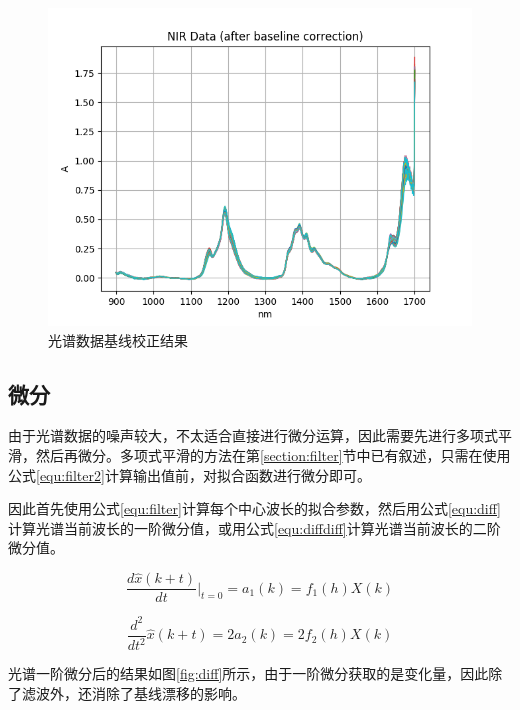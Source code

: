 \documentclass[a4paper, 12pt]{article}
\begin{document}
			\begin{figure}
				\centering
				\includegraphics[width=0.8\linewidth]{../img/baseline}
				\caption{光谱数据基线校正结果}
				\label{fig:baseline}
			\end{figure}
			
		\subsection{微分}
			由于光谱数据的噪声较大，不太适合直接进行微分运算，因此需要先进行多项式平滑，然后再微分。多项式平滑的方法在第\ref{section:filter}节中已有叙述，只需在使用公式\ref{equ:filter2}计算输出值前，对拟合函数进行微分即可。
			
			因此首先使用公式\ref{equ:filter}计算每个中心波长的拟合参数，然后用公式\eqref{equ:diff}计算光谱当前波长的一阶微分值，或用公式\eqref{equ:diffdiff}计算光谱当前波长的二阶微分值。
			
			\begin{equation}\label{equ:diff}
				\frac{d\hat{x}(k+t)}{dt}\bigg|_{t=0}
				= a_1(k) =
				f_1(h)X(k)
			\end{equation}
			
			\begin{equation}\label{equ:diffdiff}
				\frac{d^2}{dt^2}\hat{x}(k+t)
				= 2a_2(k) =
				2f_2(h)X(k)
			\end{equation}
			
			光谱一阶微分后的结果如图\ref{fig:diff}所示，由于一阶微分获取的是变化量，因此除了滤波外，还消除了基线漂移的影响。
			
\end{document}
